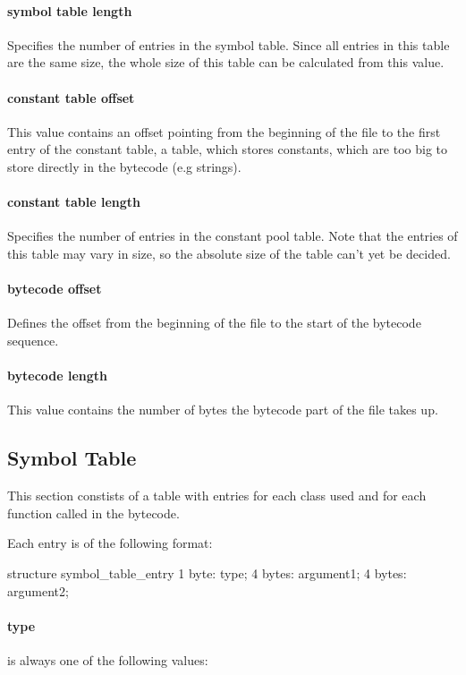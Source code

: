 \documentclass[12pt]{article}
\begin{document}
\paragraph{symbol table length}
    Specifies the number of entries in the symbol table. Since all entries in this table
    are the same size, the whole size of this table can be calculated from this value.

\paragraph{constant table offset}
    This value contains an offset pointing from the beginning of the file to the first entry
    of the constant table, a table, which stores constants, which are too big to store
    directly in the bytecode (e.g strings). 

\paragraph{constant table length}
    Specifies the number of entries in the constant pool table. Note that the entries of this
    table may vary in size, so the absolute size of the table can't yet be decided.

\paragraph{bytecode offset}
    Defines the offset from the beginning of the file to the start of the bytecode sequence.

\paragraph{bytecode length}
    This value contains the number of bytes the bytecode part of the file takes up.

\subsection*{Symbol Table}
This section constists of a table with entries for each class used and for each function called in the bytecode.

Each entry is of the following format:

\begin{code}[language=C]
structure symbol_table_entry {
    1 byte:  type;
    4 bytes: argument1;
    4 bytes: argument2;
}
\end{code}

\paragraph{type} is always one of the following values:
 
\end{document}
